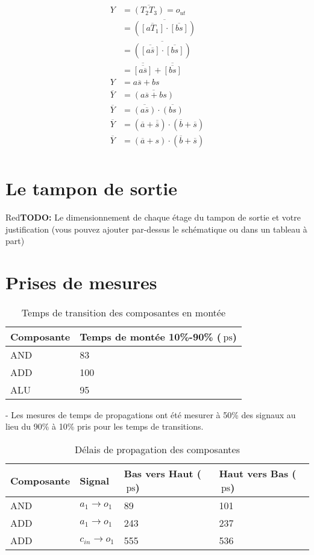 \documentclass[a11paper]{article}
\newcommand{\todo}[1]{\begin{color}{Red}\textbf{TODO:} #1\end{color}}
\newcommand{\quicktab}[4]{
  \begin{table}[H]
    \centering
    \caption{#1}
    \label{tab:#2}
    \begin{tabular}{#3}
      #4
    \end{tabular}
  \end{table}
}
\begin{document}
\begin{align}
  Y &= \overline{(T_2T_3)} = o_{ut}  \\
  &= \overline{(\overline{[aT_1]}\cdot\overline{[bs]} )} \\
  &= \overline{(\overline{[a\overline{s}]}\cdot\overline{[bs]} )} \\
  &= \overline{\overline{[a\overline{s}]}} + \overline{\overline{[bs]}} \\
  Y &= a\overline{s} + bs \\
  \overline{Y} &= \overline{(a\overline{s} + bs)} \\
  \overline{Y} &= \overline{(a\overline{s})} \cdot \overline{(bs)} \\
  \overline{Y} &= (\overline{a}+\overline{\overline{s}}) \cdot (\overline{b}+\overline{s}) \\
  \overline{Y} &= (\overline{a}+s) \cdot (\overline{b}+\overline{s}) \\
\end{align}


\section{Le tampon de sortie}
\todo{Le dimensionnement de chaque étage du tampon de sortie et votre justification (vous
pouvez ajouter par-dessus le schématique ou dans un tableau à part)}

\section{Prises de mesures}

\quicktab{Temps de transition des composantes en montée}{ttLH-Sortie}{ll}{
\toprule
Composante & Temps de montée 10\%-90\% ($\SI{}{\pico\s}$) \\
\midrule
AND & 83 \\
ADD & 100 \\ %
ALU & 95 \\
\bottomrule
}

- Les mesures de temps de propagations ont été mesurer à 50\% des signaux au lieu du 90\% à 10\% pris pour les temps de transitions.

\quicktab{Délais de propagation des composantes}{propagation}{llll}{
\toprule
Composante & Signal & Bas vers Haut ($\SI{}{\pico\s}$) & Haut vers Bas ($\SI{}{\pico\s}$) \\
\midrule
AND & $a_1 \rightarrow o_1$ & 89 & 101 \\
ADD & $a_1 \rightarrow o_1$ & 243 & 237 \\
ADD & $c_{in} \rightarrow o_1$ & 555 & 536 \\
\bottomrule
}




\end{document}
